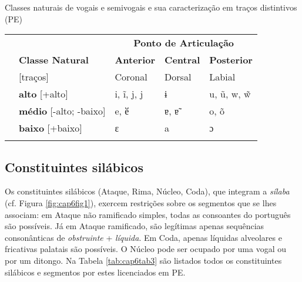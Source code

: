 \documentclass[output=paper,colorlinks,citecolor=brown,booklanguage=portuguese]{langscibook}
\begin{document}
\begin{Tabela}
\caption{Classes naturais de vogais e semivogais e sua caracterização em traços distintivos (PE)}
\label{tab:cap6tab2}


\begin{tabularx}{.8\textwidth}{Xllll}
\lsptoprule
  & &  \multicolumn{3}{c}{\textbf{Ponto de Articulação}}\\
  \cmidrule(lr){3-5}
  & \textbf{Classe Natural} & \textbf{Anterior}  &\textbf{Central} & \textbf{Posterior} \\
  & [traços] & Coronal & Dorsal & Labial\\
  \midrule
  \parbox[t]{2mm}{} & \textbf{alto} [+alto] & i, ĩ, j, j &  ɨ & u, ũ, w, w̃ \\
  & \textbf{médio} [-alto; -baixo] & e, ӗ & ɐ, ɐ̃ & o, õ\\
  & \textbf{baixo} [+baixo] & ɛ & a & ɔ\\
\lspbottomrule
\end{tabularx}
\end{Tabela}



\subsection{Constituintes silábicos}

Os constituintes silábicos (Ataque, Rima, Núcleo, Coda), que integram a \emph{sílaba} (cf. Figura \ref{fig:cap6fig1}), exercem restrições sobre os segmentos que se lhes associam: em Ataque não ramificado simples, todas as consoantes do português são possíveis. Já em Ataque ramificado, são legítimas apenas sequências consonânticas de \emph{obstruinte} + \emph{líquida}. Em Coda, apenas líquidas alveolares e fricativas palatais são possíveis. O Núcleo pode ser ocupado por uma vogal ou por um ditongo. Na Tabela \ref{tab:cap6tab3} são listados todos os constituintes silábicos e segmentos por estes licenciados em PE.
\end{document}
